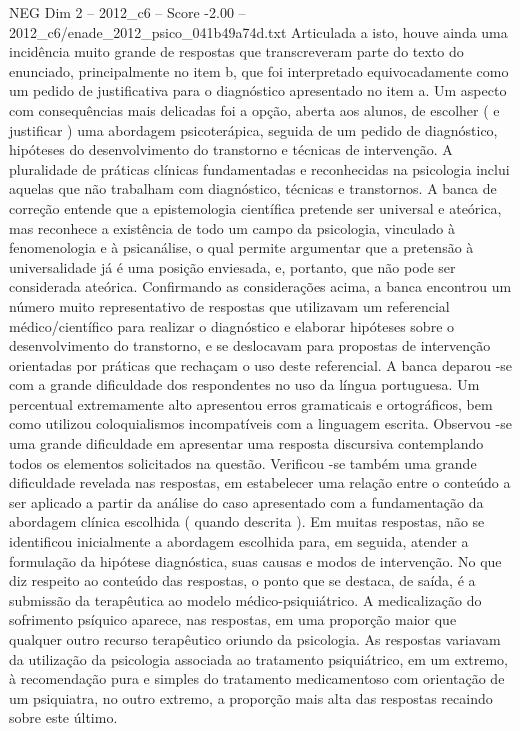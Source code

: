 \begin{textsample}{NEG Dim 2 – 2012\_c6 – Score -2.00 – 2012\_c6/enade\_2012\_psico\_041b49a74d.txt}
Articulada a isto, houve ainda uma incidência muito grande de respostas que transcreveram parte do texto do enunciado, principalmente no item b, que foi interpretado equivocadamente como um pedido de justificativa para o diagnóstico apresentado no item a.
Um aspecto com consequências mais delicadas foi a opção, aberta aos alunos, de escolher ( e justificar ) uma abordagem psicoterápica, seguida de um pedido de diagnóstico, hipóteses do desenvolvimento do transtorno e técnicas de intervenção.
A pluralidade de práticas clínicas fundamentadas e reconhecidas na psicologia inclui aquelas que não trabalham com diagnóstico, técnicas e transtornos.
A banca de correção entende que a epistemologia científica pretende ser universal e ateórica, mas reconhece a existência de todo um campo da psicologia, vinculado à fenomenologia e à psicanálise, o qual permite argumentar que a pretensão à universalidade já é uma posição enviesada, e, portanto, que não pode ser considerada ateórica.
Confirmando as considerações acima, a banca encontrou um número muito representativo de respostas que utilizavam um referencial médico/científico para realizar o diagnóstico e elaborar hipóteses sobre o desenvolvimento do transtorno, e se deslocavam para propostas de intervenção orientadas por práticas que rechaçam o uso deste referencial.
A banca deparou -se com a grande dificuldade dos respondentes no uso da língua portuguesa.
Um percentual extremamente alto apresentou erros gramaticais e ortográficos, bem como utilizou coloquialismos incompatíveis com a linguagem escrita.
Observou -se uma grande dificuldade em apresentar uma resposta discursiva contemplando todos os elementos solicitados na questão.
Verificou -se também uma grande dificuldade revelada nas respostas, em estabelecer uma relação entre o conteúdo a ser aplicado a partir da análise do caso apresentado com a fundamentação da abordagem clínica escolhida ( quando descrita ).
Em muitas respostas, não se identificou inicialmente a abordagem escolhida para, em seguida, atender a formulação da hipótese diagnóstica, suas causas e modos de intervenção.
No que diz respeito ao conteúdo das respostas, o ponto que se destaca, de saída, é a submissão da terapêutica ao modelo médico-psiquiátrico.
A medicalização do sofrimento psíquico aparece, nas respostas, em uma proporção maior que qualquer outro recurso terapêutico oriundo da psicologia.
As respostas variavam da utilização da psicologia associada ao tratamento psiquiátrico, em um extremo, à recomendação pura e simples do tratamento medicamentoso com orientação de um psiquiatra, no outro extremo, a proporção mais alta das respostas recaindo sobre este último.

\end{textsample}
